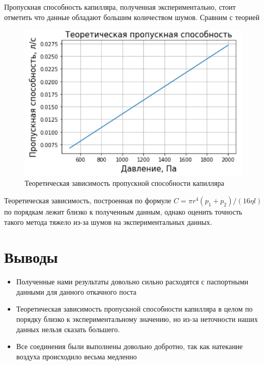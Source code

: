 \documentclass[a4paper,14pt]{extarticle}
\begin{document}
			Пропускная способность капилляра, полученная экспериментально, стоит отметить что данные обладают большим количеством шумов. Сравним с теорией
			\begin{figure}[h!]
				\centering
				\includegraphics[width=.75\linewidth]{Screenshot_70.png}
				\caption{Теоретическая зависимость пропускной способности капилляра}
				\label{fig1}
			\end{figure}
		
			Теоретическая зависимость, построенная по формуле $C = \pi r^4 (p_1 + p_2) / (16 \eta l)$ по порядкам лежит близко к полученным данным, однако оценить точность такого метода тяжело из-за шумов на экспериментальных данных.
	\section{Выводы}
		\begin{itemize}
			\item Полученные нами результаты довольно сильно расходятся с паспортными данными для данного откачного поста
			\item Теоретическая зависимость пропускной способности капилляра в целом по порядку близко к экспериментальному значению, но из-за неточности наших данных нельзя сказать большего.
			\item Все соединения были выполнены довольно добротно, так как натекание воздуха происходило весьма медленно
		\end{itemize}
\end{document}
